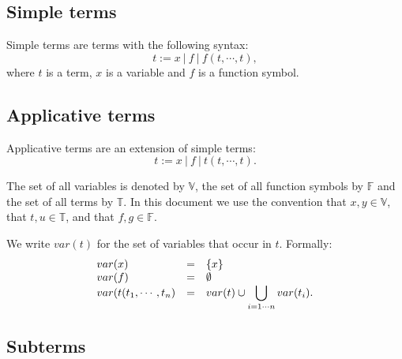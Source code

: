 \documentclass{article}
\begin{document}
\subsection{Simple terms}

Simple terms are terms with the following syntax:%
\begin{equation}
t:=x\ |\ f\ |\ f(t,\cdots ,t),  \label{eq:simple_terms}
\end{equation}%
where $t$ is a term, $x$ is a variable and $f$ is a function symbol.

\subsection{Applicative terms}

Applicative terms are an extension of simple terms:%
\begin{equation}
t:=x\ |\ f\ |\ t(t,\cdots ,t).  \label{eq:applicative_terms}
\end{equation}

The set of all variables is denoted by $\mathbb{V}$, the set of all function
symbols by $\mathbb{F}$ and the set of all terms by $\mathbb{T}$. In this
document we use the convention that $x,y\in \mathbb{V}$, that $t,u\in 
\mathbb{T}$, and that $f,g\in \mathbb{F}$.

We write $var(t)$ for the set of variables that occur in $t$. Formally:%
\begin{equation*}
\begin{array}{lll}
var(x) & = & \{x\} \\ 
var(f) & = & \emptyset \\ 
var(t(t_{1},\cdots ,t_{n}) & = & var(t)\cup \dbigcup\limits_{i=1\cdots
n}var(t_{i}).%
\end{array}%
\end{equation*}

\subsection{Subterms}
\end{document}
